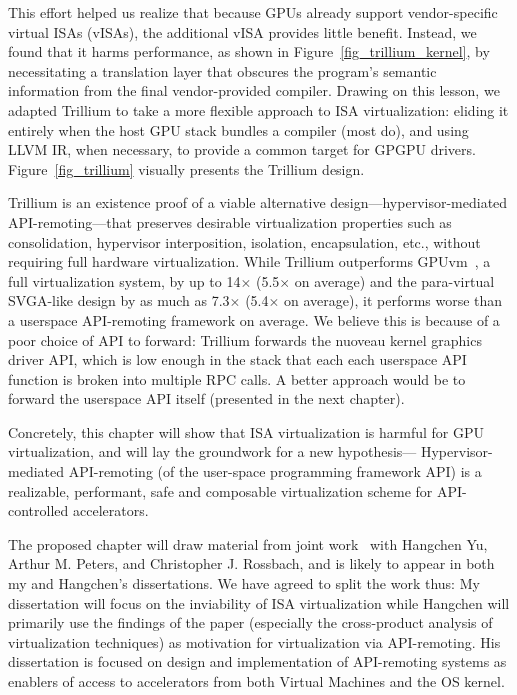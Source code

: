 This effort helped us realize that because GPUs already support vendor-specific
virtual ISAs (vISAs), the additional vISA provides little benefit.
Instead, we found that it harms performance, as shown in
Figure~\ref{fig_trillium_kernel}, by necessitating a translation layer that
obscures the program's semantic information from the final vendor-provided
compiler.
Drawing on this lesson, we adapted Trillium to take a more flexible approach
to ISA virtualization: eliding it entirely when the host GPU stack bundles a
compiler (most do), and using LLVM IR, when necessary, to provide a common
target for GPGPU drivers. Figure~\ref{fig_trillium} visually presents the
Trillium design.

Trillium is an existence proof of a viable alternative
design---hypervisor-mediated API-remoting---that preserves
desirable virtualization properties such as consolidation, hypervisor
interposition, isolation, encapsulation, etc., without requiring full hardware
virtualization.
While Trillium outperforms GPUvm~\cite{suzuki2014gpuvm}, a full virtualization
system, by up to 14$\times$ (5.5$\times$ on average) and the para-virtual
SVGA-like design by as much as 7.3$\times$ (5.4$\times$ on average), it
performs worse than a userspace API-remoting framework on average. We believe
this is because of a poor choice of API to forward: Trillium forwards the
nuoveau kernel graphics driver API, which is low enough in the stack that each
each userspace API function is broken into multiple RPC calls. A better
approach would be to forward the userspace API itself (presented in the next
chapter).

Concretely, this chapter will show that ISA virtualization is harmful for GPU
virtualization, and will lay the groundwork for a new hypothesis---%
Hypervisor-mediated API-remoting (of the user-space programming framework API)
is a realizable, performant, safe and composable virtualization scheme for
API-controlled accelerators.

The proposed chapter will draw material from joint work~\cite{trillium} with
Hangchen Yu, Arthur M. Peters, and Christopher J. Rossbach, and is likely to
appear in both my and Hangchen's dissertations. We have agreed to split the
work thus: My dissertation will focus on the inviability of ISA virtualization
while Hangchen will primarily use the findings of the paper (especially the
cross-product analysis of virtualization techniques) as motivation for
virtualization via API-remoting. His dissertation is focused on design and
implementation of API-remoting systems as enablers of access to accelerators
from both Virtual Machines and the OS kernel.